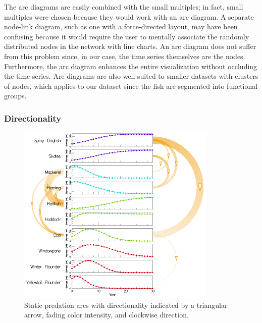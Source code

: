 The arc diagrams are easily combined with the small multiples; in fact, small multiples were chosen because they would work with an arc diagram.  A separate node-link diagram, such as one with a force-directed layout, may have been confusing because it would require the user to mentally associate the randomly distributed nodes in the network with line charts.  An arc diagram does not suffer from this problem since, in our case, the time series themselves are the nodes.  Furthermore, the arc diagram enhances the entire visualization without occluding the time series.  Arc diagrams are also well suited to smaller datasets with clusters of nodes, which applies to our dataset since the fish are segmented into functional groups.

\subsubsection{Directionality}

\begin{figure}[t]
	\centering
	\includegraphics[width=0.85\textwidth]{figures/png/arcs_directionality.png}
	\caption[Static predation arcs with directionality indicated by a triangular arrow, fading color intensity, and clockwise direction]{Static predation arcs with directionality indicated by a triangular arrow, fading color intensity, and clockwise direction.}
	\label{fig:arcs_directionality}
\end{figure}

